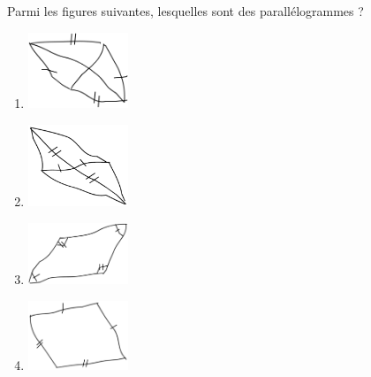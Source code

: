 
\begin{exercice}\label{exo2smath-0166}

    Parmi les figures suivantes, lesquelles sont des parallélogrammes ?
    \begin{multicols}{2}
    \begin{enumerate}
        \item
           \includegraphics[width=3cm]{faux_paral1.pdf} 
        \item
           \includegraphics[width=3cm]{faux_paral2.pdf} 
        \item
           \includegraphics[width=3cm]{faux_paral3.pdf} 
        \item
           \includegraphics[width=3cm]{faux_paral4.pdf} 
    \end{enumerate}
    \end{multicols}

\end{exercice}
